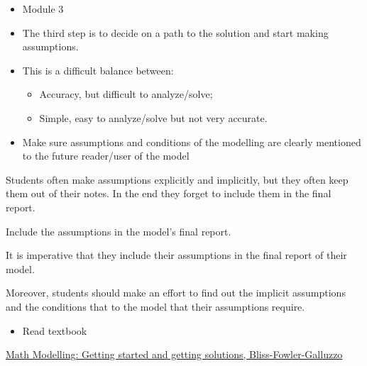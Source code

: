\begin{lesson}

	\begin{itemize}
		\item Module 3
	\end{itemize}

	\begin{itemize}
		\item The third step is to decide on a path to the solution and start making assumptions.
		
		\item This is a difficult balance between:
		\begin{itemize}
			\item Accuracy, but difficult to analyze/solve;
			\item Simple, easy to analyze/solve but not very accurate.
		\end{itemize}

	\item Make sure assumptions and conditions of the modelling are clearly mentioned to the future reader/user of the model
	\end{itemize}
	
	

Students often make assumptions explicitly and implicitly, but they often keep them out of their notes. In the end they forget to include them in the final report.

\begin{annotation}
\begin{goals}
	Include the assumptions in the model's final report.
\end{goals}
\end{annotation}
It is imperative that they include their assumptions in the final report of their model.

Moreover, students should make an effort to find out the implicit assumptions and the conditions that to the model that their assumptions require.


\begin{itemize}
	\item Read textbook
\end{itemize}

\begin{annotation}
	\begin{goals}
	\end{goals}
\end{annotation}
	 \href{https://m3challenge.siam.org/resources/modeling-handbook}{Math Modelling: Getting started and getting solutions, Bliss-Fowler-Galluzzo}

\end{lesson}




